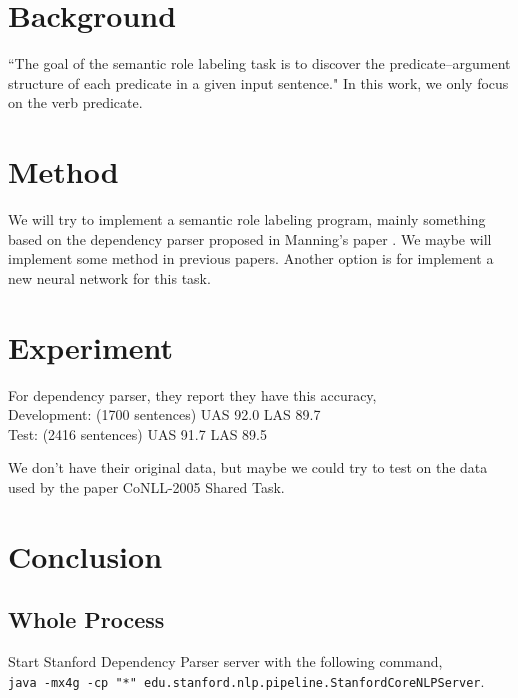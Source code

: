 \documentclass[letterpaper]{article}
\begin{document}
	\section{Background}
	``The goal of the semantic role labeling task is to discover the predicate–argument structure
	of each predicate in a given input sentence." In this work, we only focus on the verb predicate.
	
	\section{Method}
	We will try to implement a semantic role labeling program, mainly something based on the dependency parser proposed in Manning's paper \cite{manning-EtAl:2014:P14-5}. We maybe will implement some method in previous papers. Another option is for implement a new neural network for this task.
	
	\section{Experiment}
	For dependency parser, they report they have this accuracy,\\
	Development: 	(1700 sentences)	UAS	92.0	LAS	89.7\\
	Test:			(2416 sentences)	UAS	91.7	LAS	89.5
	
	We don't have their original data, but maybe we could try to test on the data used by the paper CoNLL-2005 Shared Task.
	
	
	
	
	\section{Conclusion}
	

	



\begin{appendices}


  \section{Whole Process}
Start Stanford Dependency Parser server with the following command, \\
\lstinline [language==bash]{java -mx4g -cp "*" edu.stanford.nlp.pipeline.StanfordCoreNLPServer}.


\end{appendices}

	
\end{document}
